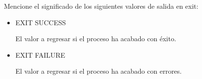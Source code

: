 	Mencione el significado de los siguientes valores de salida en exit:

	\begin{itemize}

		\item EXIT SUCCESS
	\begin{tcolorbox}
		El valor a regresar si el proceso ha acabado con éxito.
	\end{tcolorbox}
		\item EXIT FAILURE
	\begin{tcolorbox}
		El valor a regresar si el proceso ha acabado con errores.
	\end{tcolorbox}

	\end{itemize}